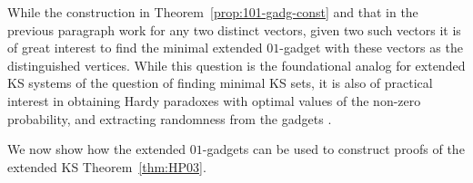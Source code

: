 \documentclass[twocolumn, a4paper, superscriptaddress,nofootinbib, accepted=2020-08-07, hyperref]{quantumarticle}
\begin{document}
 

While the construction in Theorem~\ref{prop:101-gadg-const} and that in the previous paragraph work for any two distinct vectors, given two such vectors it is of great interest to find the minimal extended $01$-gadget with these vectors as the distinguished vertices. While this question is the foundational analog for extended KS systems of the question of finding minimal KS sets, it is also of practical interest in obtaining Hardy paradoxes with optimal values of the non-zero probability, and extracting randomness from the gadgets \cite{R17}. 

We now show how the extended $01$-gadgets can be used to construct proofs of the extended KS Theorem~\ref{thm:HP03}. 
\end{document}

